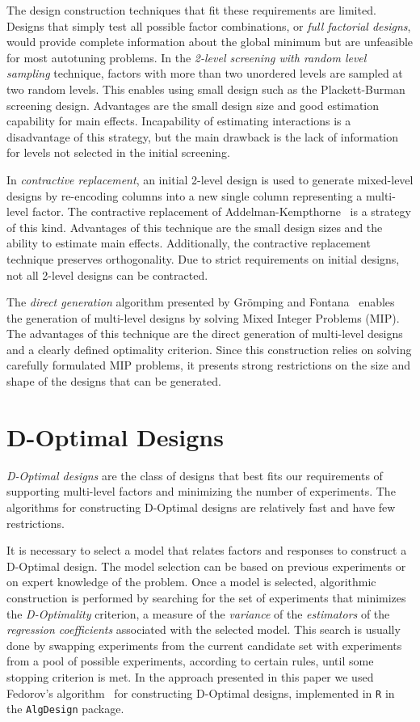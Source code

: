 \documentclass[conference]{IEEEtran}
\begin{document}
The design construction techniques that fit these requirements are limited.
Designs that simply test all possible factor combinations, or \emph{full factorial
designs}, would provide complete information about the global minimum but are
unfeasible for most autotuning problems. In the \emph{2-level screening with random
level sampling} technique, factors with more than two unordered levels are
sampled at two random levels. This enables using small design such as the
Plackett-Burman~\cite{plackett1946design} screening design. Advantages are
the small design size and good estimation capability for main effects.
Incapability of estimating interactions is a disadvantage of this strategy, but
the main drawback is the lack of information for levels not selected in the
initial screening.

In \emph{contractive replacement}, an initial 2-level design is used to generate
mixed-level designs by re-encoding columns into a new single column representing
a multi-level factor. The contractive replacement of
Addelman-Kempthorne~\cite{addelman1961some} is a strategy of this kind.
Advantages of this technique are the small design sizes and the ability to
estimate main effects. Additionally, the contractive replacement technique
preserves orthogonality. Due to strict requirements on initial designs, not all
2-level designs can be contracted.

The \emph{direct generation} algorithm presented by Grömping and
Fontana~\cite{ulrike2018algorithm} enables the generation of multi-level
designs by solving Mixed Integer Problems (MIP). The advantages of this
technique are the direct generation of multi-level designs and a clearly defined
optimality criterion. Since this construction relies on solving carefully
formulated MIP problems, it presents strong restrictions on the size and shape
of the designs that can be generated.
\section{D-Optimal Designs}
\label{sec:org2305112}
\emph{D-Optimal designs} are the class of designs that best fits our requirements of
supporting multi-level factors and minimizing the number of experiments. The
algorithms for constructing D-Optimal designs are relatively fast and have few
restrictions.

It is necessary to select a model that relates factors and responses to
construct a D-Optimal design. The model selection can be based on previous
experiments or on expert knowledge of the problem. Once a model is selected,
algorithmic construction is performed by searching for the set of experiments
that minimizes the \emph{D-Optimality} criterion, a measure of the \emph{variance} of the
\emph{estimators} of the \emph{regression coefficients} associated with the selected
model. This search is usually done by swapping experiments from the current
candidate set with experiments from a pool of possible experiments, according to
certain rules, until some stopping criterion is met. In the approach presented
in this paper we used Fedorov's algorithm~\cite{fedorov1972theory} for
constructing D-Optimal designs, implemented in \texttt{R} in the \texttt{AlgDesign} package.
\end{document}
